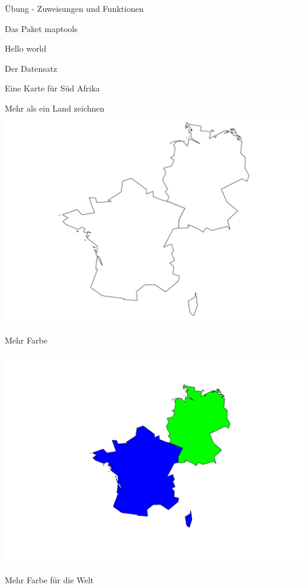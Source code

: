 \documentclass[ignorenonframetext,]{beamer}
\begin{document}
\begin{frame}[fragile]{Übung - Zuweisungen und Funktionen}
\begin{frame}[fragile]{Das Paket maptools}
\begin{frame}[fragile]{Hello world}
\begin{frame}[fragile]{Der Datensatz}
\begin{frame}[fragile]{Eine Karte für Süd Afrika}
\begin{frame}{Mehr als ein Land zeichnen}
\includegraphics{Geomedizin_files/figure-beamer/unnamed-chunk-93-1.pdf}

\end{frame}

\begin{frame}{Mehr Farbe}

\includegraphics{Geomedizin_files/figure-beamer/unnamed-chunk-94-1.pdf}

\end{frame}

\begin{frame}{Mehr Farbe für die Welt}


\end{frame}
\end{frame}
\end{frame}
\end{frame}
\end{frame}
\end{frame}
\end{document}

